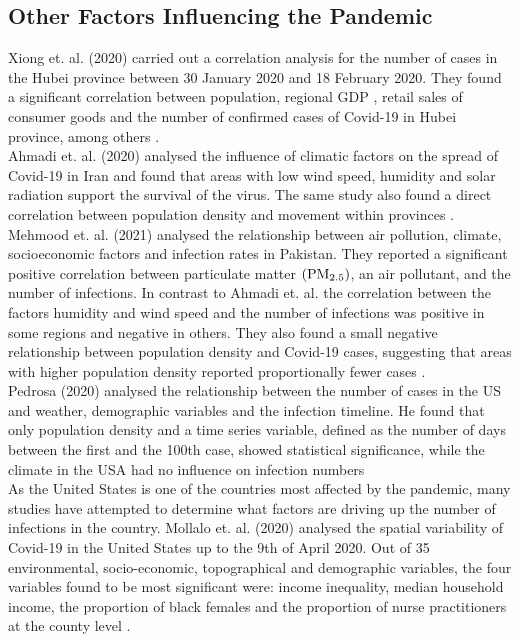 \subsection*{Other Factors Influencing the Pandemic}
Xiong et. al. (2020) carried out a correlation analysis for the number of cases in the Hubei province between 30 January 2020 and 18 February 2020. They found a significant correlation between population, regional GDP , retail sales of consumer goods and the number of confirmed cases of Covid-19 in Hubei province, among others \autocite[][]{xiong2020spatial}. \\
Ahmadi et. al. (2020) analysed the influence of climatic factors on the spread of Covid-19 in Iran and found that areas with low wind speed, humidity and solar radiation support the survival of the virus. The same study also found a direct correlation between population density and movement within provinces \autocite[][]{ahmadi2020investigation}. Mehmood et. al. (2021) analysed the relationship between air pollution, climate, socioeconomic factors and infection rates in Pakistan. They reported a significant positive correlation between particulate matter $\left(\hbox{PM}_{2.5}\right)$, an air pollutant, and the number of infections. In contrast to Ahmadi et. al. the correlation between the factors humidity and wind speed and the number of infections was positive in some regions and negative in others. They also found a small negative relationship between population density and Covid-19 cases, suggesting that areas with higher population density reported proportionally fewer cases \autocite[][]{mehmood2021spatiotemporal}. \\
Pedrosa (2020) analysed the relationship between the number of cases in the US and weather, demographic variables and the infection timeline. He found that only population density and a time series variable, defined as the number of days between the first and the 100th case, showed statistical significance, while the climate in the USA had no influence on infection numbers \autocite[][]{pedrosa2020dynamics} \\
As the United States is one of the countries most affected by the pandemic, many studies have attempted to determine what factors are driving up the number of infections in the country. Mollalo et. al. (2020) analysed the spatial variability of Covid-19 in the United States up to the 9th of April 2020. Out of 35 environmental, socio-economic, topographical and demographic variables, the four variables found to be most significant were: income inequality, median household income, the proportion of black females and the proportion of nurse practitioners at the county level \autocite[][]{mollalo2020gis}. \\

